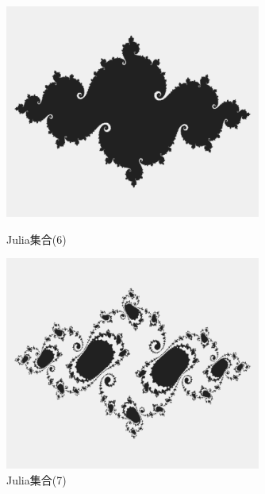 \documentclass[dvipdfmx]{jsarticle}
\theoremstyle{definition}
\begin{document}
\begin{figure}[H]
    \begin{minipage}{0.5\hsize}
        \centering
        \includegraphics[width=0.75\textwidth]{figure/others/set/julia_set6.png}
        \caption{Julia集合(6)}
    \end{minipage}
    \begin{minipage}{0.49\hsize}
        \centering
        \includegraphics[width=0.75\textwidth]{figure/others/set/julia_set7.png}
        \caption{Julia集合(7)}
    \end{minipage}
\end{figure}
\end{document}
